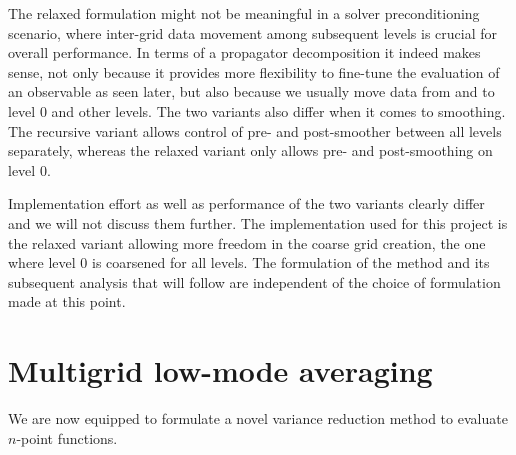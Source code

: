 The relaxed formulation might not be meaningful in a solver preconditioning scenario, where inter-grid data movement among subsequent levels is crucial for overall performance.
In terms of a propagator decomposition it indeed makes sense, not only because it provides more flexibility to fine-tune the evaluation of an observable as seen later, but also because we usually move data from and to level \num{0} and other levels.
The two variants also differ when it comes to smoothing.
The recursive variant allows control of pre- and post-smoother between all levels separately, whereas the relaxed variant only allows pre- and post-smoothing on level \num{0}.

Implementation effort as well as performance of the two variants clearly differ and we will not discuss them further.
The implementation used for this project is the relaxed variant allowing more freedom in the coarse grid creation, \ie the one where level \num{0} is coarsened for all levels.
The formulation of the method and its subsequent analysis that will follow are independent of the choice of formulation made at this point.



\section{Multigrid low-mode averaging}
\label{sec:mg:lma}

We are now equipped to formulate a novel variance reduction method to evaluate $n$-point functions.


